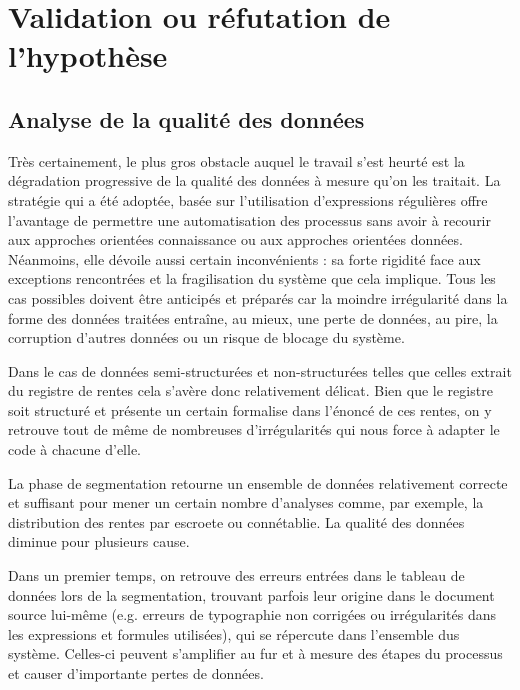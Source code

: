 \section{Validation ou réfutation de l'hypothèse}
\subsection{Analyse de la qualité des données}
Très certainement, le plus gros obstacle auquel le travail s'est heurté est la dégradation progressive de la qualité des données à mesure qu'on les traitait.
La stratégie qui a été adoptée, basée sur l'utilisation d'expressions régulières offre l'avantage de permettre une automatisation des processus sans avoir à recourir aux approches orientées connaissance ou aux approches orientées données. Néanmoins, elle dévoile aussi certain inconvénients : sa forte rigidité face aux exceptions rencontrées et la fragilisation du système que cela implique. Tous les cas possibles doivent être anticipés et préparés car la moindre irrégularité dans la forme des données traitées entraîne, au mieux, une perte de données, au pire, la corruption d'autres données ou un risque de blocage du système.

Dans le cas de données semi-structurées et non-structurées telles que celles extrait du registre de rentes cela s'avère donc relativement délicat. Bien que le registre soit structuré et présente un certain formalise dans l'énoncé de ces rentes, on y retrouve tout de même de nombreuses d'irrégularités qui nous force à adapter le code à chacune d'elle. 

La phase de segmentation retourne un ensemble de données relativement correcte et suffisant pour mener un certain nombre d'analyses comme, par exemple, la distribution des rentes par escroete ou connétablie. 
La qualité des données diminue pour plusieurs cause.

Dans un premier temps, on retrouve des erreurs entrées dans le tableau de données lors de la segmentation, trouvant parfois leur origine dans le document source lui-même (e.g. erreurs de typographie non corrigées ou irrégularités dans les expressions et formules utilisées), qui se répercute dans l'ensemble dus système. Celles-ci peuvent s'amplifier au fur et à mesure des étapes du processus et causer d'importante pertes de données. 







